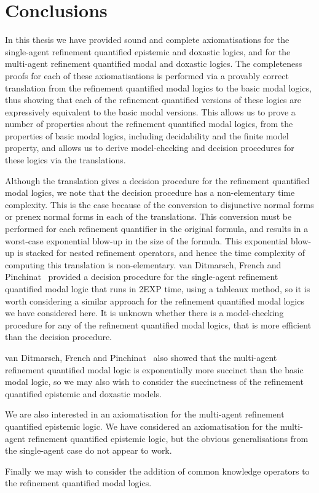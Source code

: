 \chapter{Conclusions}

In this thesis we have provided sound and complete axiomatisations for the
single-agent refinement quantified epistemic and doxastic logics, and for the
multi-agent refinement quantified modal and doxastic logics. The completeness
proofs for each of these axiomatisations is performed via a provably correct
translation from the refinement quantified modal logics to the basic modal
logics, thus showing that each of the refinement quantified versions of these
logics are expressively equivalent to the basic modal versions. This allows us
to prove a number of properties about the refinement quantified modal logics,
from the properties of basic modal logics, including decidability and the finite
model property, and allows us to derive model-checking and decision procedures
for these logics via the translations.

Although the translation gives a decision procedure for the refinement
quantified modal logics, we note that the decision procedure has a
non-elementary time complexity. This is the case because of the conversion to
disjunctive normal forms or prenex normal forms in each of the translations.
This conversion must be performed for each refinement quantifier in the original
formula, and results in a worst-case exponential blow-up in the size of the
formula. This exponential blow-up is stacked for nested refinement operators,
and hence the time complexity of computing this translation is non-elementary.
van Ditmarsch, French and Pinchinat~\cite{french2010future} provided a decision
procedure for the single-agent refinement quantified modal logic that runs in
2EXP time, using a tableaux method, so it is worth considering a similar
approach for the refinement quantified modal logics we have considered here.
It is unknown whether there is a model-checking procedure for any of the
refinement quantified modal logics, that is more efficient than the decision
procedure.

van Ditmarsch, French and Pinchinat~\cite{french2010future} also showed
that the multi-agent refinement quantified modal logic is exponentially more
succinct than the basic modal logic, so we may also wish to consider the
succinctness of the refinement quantified epistemic and doxastic models.

We are also interested in an axiomatisation for the multi-agent refinement
quantified epistemic logic. We have considered an axiomatisation for the
multi-agent refinement quantified epistemic logic, but the obvious
generalisations from the single-agent case do not appear to work.

Finally we may wish to consider the addition of common knowledge operators to
the refinement quantified modal logics.
